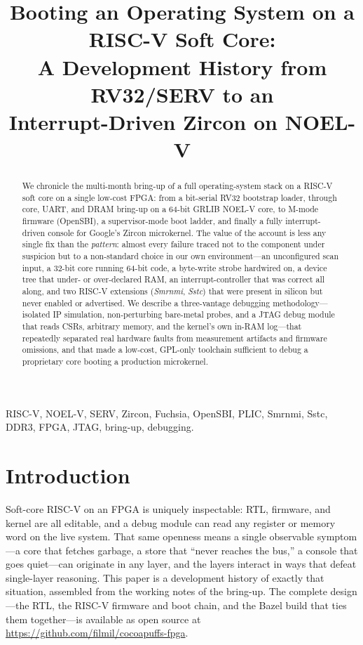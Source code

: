 \documentclass[conference,nofonttune]{IEEEtran}
\begin{document}
\title{Booting an Operating System on a RISC-V Soft Core:\\
A Development History from RV32/SERV to an\\
Interrupt-Driven Zircon on NOEL-V}

\author{
}

\maketitle

\begin{abstract}
We chronicle the multi-month bring-up of a full operating-system stack on a
RISC-V soft core on a single low-cost FPGA: from a bit-serial RV32 bootstrap
loader, through core, UART, and DRAM bring-up on a 64-bit GRLIB NOEL-V core, to
M-mode firmware (OpenSBI), a supervisor-mode boot ladder, and finally a
fully interrupt-driven console for Google's Zircon microkernel. The value of the
account is less any single fix than the \emph{pattern}: almost every failure
traced not to the component under suspicion but to a non-standard choice in our
own environment---an unconfigured scan input, a 32-bit core running 64-bit code,
a byte-write strobe hardwired on, a device tree that under- or over-declared RAM,
an interrupt-controller that was correct all along, and two RISC-V extensions
(\emph{Smrnmi}, \emph{Sstc}) that were present in silicon but never enabled or
advertised. We describe a three-vantage debugging methodology---isolated IP
simulation, non-perturbing bare-metal probes, and a JTAG debug module that reads
CSRs, arbitrary memory, and the kernel's own in-RAM log---that repeatedly
separated real hardware faults from measurement artifacts and firmware
omissions, and that made a low-cost, GPL-only toolchain sufficient to debug a
proprietary core booting a production microkernel.
\end{abstract}

\begin{IEEEkeywords}
RISC-V, NOEL-V, SERV, Zircon, Fuchsia, OpenSBI, PLIC, Smrnmi, Sstc, DDR3,
FPGA, JTAG, bring-up, debugging.
\end{IEEEkeywords}

\section{Introduction}

Soft-core RISC-V on an FPGA is uniquely inspectable: RTL, firmware, and kernel
are all editable, and a debug module can read any register or memory word on the
live system. That same openness means a single observable symptom---a core that
fetches garbage, a store that ``never reaches the bus,'' a console that goes
quiet---can originate in any layer, and the layers interact in ways that defeat
single-layer reasoning. This paper is a development history of exactly that
situation, assembled from the working notes of the bring-up. The complete
design---the RTL, the RISC-V firmware and boot chain, and the Bazel build that
ties them together---is available as open source at
\url{https://github.com/filmil/cocoapuffs-fpga}.
\end{document}
